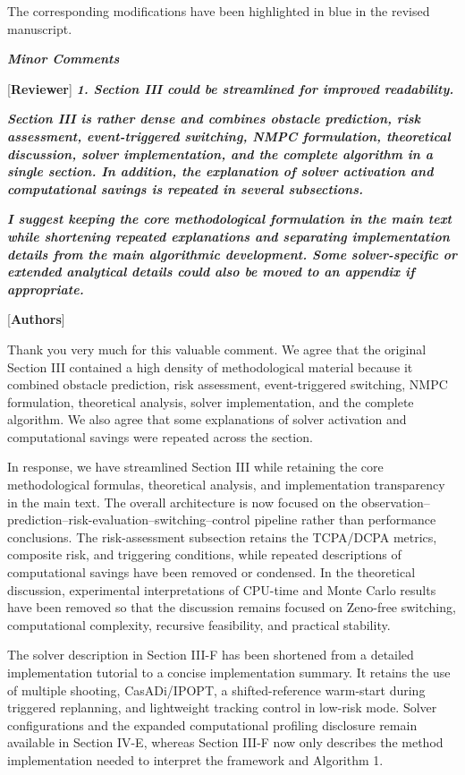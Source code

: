 \documentclass[12pt, twosides]{article}
\theoremstyle{definition}
\begin{document}
The corresponding modifications have been highlighted in blue in the revised manuscript.

\medskip

\textit{\textbf{Minor Comments}}

\textcolor[rgb]{0.00,0.00,1.00}{[\textbf {Reviewer}]} \textit{\textbf{1. Section III could be streamlined for improved readability.}}

\textit{\textbf{Section III is rather dense and combines obstacle prediction, risk assessment, event-triggered switching, NMPC formulation, theoretical discussion, solver implementation, and the complete algorithm in a single section. In addition, the explanation of solver activation and computational savings is repeated in several subsections.}}

\textit{\textbf{I suggest keeping the core methodological formulation in the main text while shortening repeated explanations and separating implementation details from the main algorithmic development. Some solver-specific or extended analytical details could also be moved to an appendix if appropriate.}}

\textcolor[rgb]{0.00,0.00,1.00}{[\textbf{Authors}]}

Thank you very much for this valuable comment. We agree that the original Section III contained a high density of methodological material because it combined obstacle prediction, risk assessment, event-triggered switching, NMPC formulation, theoretical analysis, solver implementation, and the complete algorithm. We also agree that some explanations of solver activation and computational savings were repeated across the section.

In response, we have streamlined Section III while retaining the core methodological formulas, theoretical analysis, and implementation transparency in the main text. The overall architecture is now focused on the observation--prediction--risk-evaluation--switching--control pipeline rather than performance conclusions. The risk-assessment subsection retains the TCPA/DCPA metrics, composite risk, and triggering conditions, while repeated descriptions of computational savings have been removed or condensed. In the theoretical discussion, experimental interpretations of CPU-time and Monte Carlo results have been removed so that the discussion remains focused on Zeno-free switching, computational complexity, recursive feasibility, and practical stability.

The solver description in Section III-F has been shortened from a detailed implementation tutorial to a concise implementation summary. It retains the use of multiple shooting, CasADi/IPOPT, a shifted-reference warm-start during triggered replanning, and lightweight tracking control in low-risk mode. Solver configurations and the expanded computational profiling disclosure remain available in Section IV-E, whereas Section III-F now only describes the method implementation needed to interpret the framework and Algorithm 1.
\end{document}
